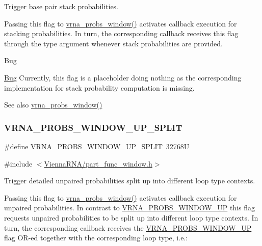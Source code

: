 Trigger base pair stack probabilities. 

Passing this flag to \mbox{\hyperlink{group__part__func__window_ga7115d012988541a65ec323c5f17a334b}{vrna\+\_\+probs\+\_\+window()}} activates callback execution for stacking probabilities. In turn, the corresponding callback receives this flag through the {\ttfamily type} argument whenever stack probabilities are provided.

\begin{DoxyRefDesc}{Bug}
\item[\mbox{\hyperlink{bug__bug000001}{Bug}}]Currently, this flag is a placeholder doing nothing as the corresponding implementation for stack probability computation is missing.\end{DoxyRefDesc}


\begin{DoxySeeAlso}{See also}
\mbox{\hyperlink{group__part__func__window_ga7115d012988541a65ec323c5f17a334b}{vrna\+\_\+probs\+\_\+window()}} 
\end{DoxySeeAlso}
\mbox{\label{group__part__func__window_ga9068f4ec008bf1c042a9357f5c2c5e13}} 
\subsubsection{\texorpdfstring{VRNA\_PROBS\_WINDOW\_UP\_SPLIT}{VRNA\_PROBS\_WINDOW\_UP\_SPLIT}}
{\footnotesize\ttfamily \#define V\+R\+N\+A\+\_\+\+P\+R\+O\+B\+S\+\_\+\+W\+I\+N\+D\+O\+W\+\_\+\+U\+P\+\_\+\+S\+P\+L\+IT~32768U}



{\ttfamily \#include $<$\mbox{\hyperlink{part__func__window_8h}{Vienna\+R\+N\+A/part\+\_\+func\+\_\+window.\+h}}$>$}



Trigger detailed unpaired probabilities split up into different loop type contexts. 

Passing this flag to \mbox{\hyperlink{group__part__func__window_ga7115d012988541a65ec323c5f17a334b}{vrna\+\_\+probs\+\_\+window()}} activates callback execution for unpaired probabilities. In contrast to \mbox{\hyperlink{group__part__func__window_ga18325811c7dfc7b7d9d4ac37f4353615}{V\+R\+N\+A\+\_\+\+P\+R\+O\+B\+S\+\_\+\+W\+I\+N\+D\+O\+W\+\_\+\+UP}} this flag requests unpaired probabilities to be split up into different loop type contexts. In turn, the corresponding callback receives the \mbox{\hyperlink{group__part__func__window_ga18325811c7dfc7b7d9d4ac37f4353615}{V\+R\+N\+A\+\_\+\+P\+R\+O\+B\+S\+\_\+\+W\+I\+N\+D\+O\+W\+\_\+\+UP}} flag O\+R-\/ed together with the corresponding loop type, i.\+e.\+:


